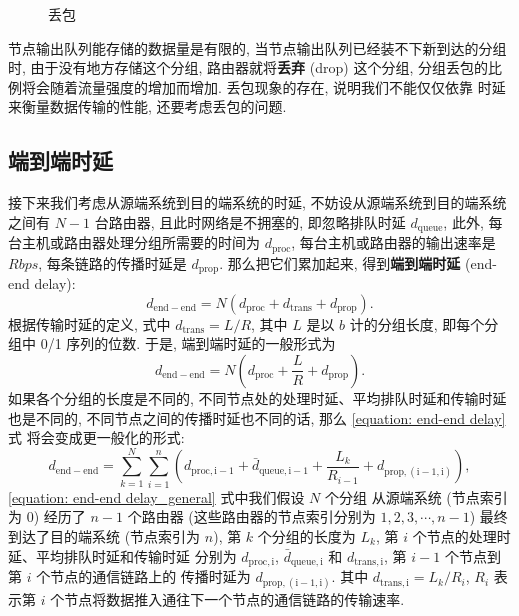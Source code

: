 \documentclass[10pt,UTF8]{book} %
\begin{document}
\begin{figure}[H]
\caption{丢包}
\end{figure}

节点输出队列能存储的数据量是有限的, 当节点输出队列已经装不下新到达的分组时,
由于没有地方存储这个分组, 路由器就将\textbf{丢弃} (drop) 这个分组,
分组丢包的比例将会随着流量强度的增加而增加. 丢包现象的存在, 说明我们不能仅仅依靠
时延来衡量数据传输的性能, 还要考虑丢包的问题.

\subsection{端到端时延}

接下来我们考虑从源端系统到目的端系统的时延, 不妨设从源端系统到目的端系统
之间有 $N-1$ 台路由器, 且此时网络是不拥塞的, 即忽略排队时延 $d_\mathrm{queue}$,
此外, 每台主机或路由器处理分组所需要的时间为 $d_\mathrm{proc}$,
每台主机或路由器的输出速率是 $R \si{bps}$, 每条链路的传播时延是
$d_\mathrm{prop}$.
那么把它们累加起来, 得到\textbf{端到端时延} (end-end delay):
\[ d_\mathrm{end-end} = N \left(
    d_\mathrm{proc} + d_\mathrm{trans} + d_\mathrm{prop}
\right). \]
根据传输时延的定义, 式中 $d_\mathrm{trans} = L/R$, 其中 $L$ 是以 $\si{b}$
计的分组长度, 即每个分组中 0/1 序列的位数.
于是, 端到端时延的一般形式为
\begin{equation}
    \label{equation: end-end delay}
    d_\mathrm{end-end} = N \left(
        d_\mathrm{proc} + \dfrac{L}{R} + d_\mathrm{prop}
    \right).
\end{equation}
如果各个分组的长度是不同的, 不同节点处的处理时延、平均排队时延和传输时延也是不同的,
不同节点之间的传播时延也不同的话, 那么 \ref{equation: end-end delay} 式
将会变成更一般化的形式:
\begin{equation}
    \label{equation: end-end delay_general}
    d_\mathrm{end-end}
    = \sum_{k=1}^{N}
    \sum_{i=1}^{n} \left( d_\mathrm{proc, i-1} 
    + \bar{d}_\mathrm{queue, i-1}
    + \dfrac{L_k}{R_{i-1}} + d_\mathrm{prop, (i-1,i)} \right),
\end{equation}
\ref{equation: end-end delay_general} 式中我们假设 $N$ 个分组
从源端系统 (节点索引为 $0$) 经历了 $n-1$ 个路由器
(这些路由器的节点索引分别为 $1,2,3,\cdots, n-1$) 最终到达了目的端系统 
(节点索引为 $n$),
第 $k$ 个分组的长度为 $L_k$, 第 $i$ 个节点的处理时延、平均排队时延和传输时延
分别为 $d_\mathrm{proc, i}$, $\bar{d}_\mathrm{queue, i}$ 和
$d_\mathrm{trans, i}$, 第 $i-1$ 个节点到第 $i$ 个节点的通信链路上的
传播时延为 $d_\mathrm{prop, (i-1,i)}$. 其中 $d_\mathrm{trans, i} =
L_k/R_i$, $R_i$ 表示第 $i$ 个节点将数据推入通往下一个节点的通信链路的传输速率.
\end{document}
